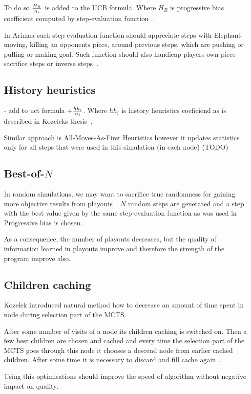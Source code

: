 To do so ${H_B \over n_i}$ is added to the UCB formula. Where $H_B$ is
progressive bias coefficient computed by step-evaluation
function~\cite{progressive-strategies}.

In Arimaa such step-evaluation function should appreciate steps with Elephant
moving, killing an opponents piece, around previous steps, which are pushing or
pulling or making goal. Such function should also handicap players own piece
sacrifice steps or inverse steps~\cite{KOZELEK}.

\subsection{History heuristics}
- add to uct formula $+ {hh_i \over n_i}$. Where $hh_i$ is history
heuristics coeficiend as is described in Kozeleks thesis~\cite{KOZELEK}.

Similar approach is All-Moves-As-First Heuristics however it updates statistics only for all steps that were used in this simulation (in each node) (TODO)

\subsection{Best-of-$N$}
In random simulations, we may want to sacrifice true randomness for gaining
more objective results from playouts~\cite{HeavyPlayouts}. $N$ random steps are
generated and a step with the best value given by the same step-evaluation
function as was used in Progressive bias is chosen.

As a consequence, the number of playouts decreases, but the quality of
information learned in playouts improve and therefore the strength of the
program improve also.

\subsection{Children caching}
Kozelek introduced natural method how to decrease an amount of time spent in
node during selection part of the MCTS.

After some number of visits of a node its children caching is switched on. Then
a few best children are chosen and cached and every time the selection part of
the MCTS goes through this node it chooses a descend node from earlier cached
children. After some time it is necessary to discard and fill cache
again~\cite{KOZELEK}.

Using this optimisations should improve the speed of algorithm without negative
impact on quality.

